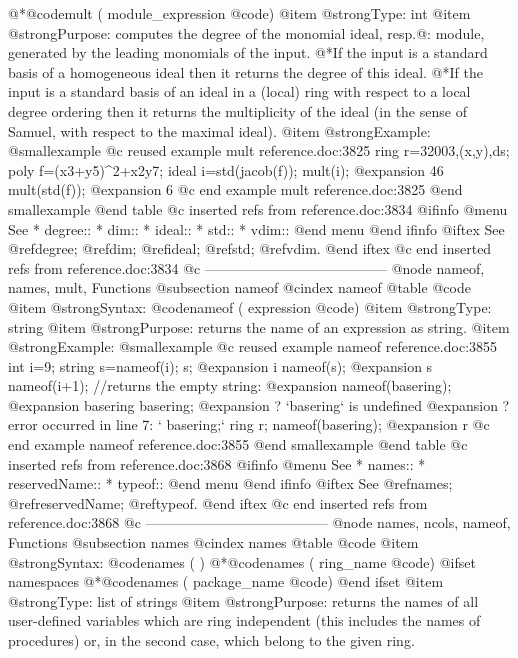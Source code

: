 {@*@code{mult (} module_expression @code{)}
@item @strong{Type:}
int
@item @strong{Purpose:}
computes the degree of the monomial ideal, resp.@: module, generated by
the leading monomials of the input.
@*If the input is a standard basis of a homogeneous ideal
then it returns the degree of this ideal.
@*If the input is a standard basis of an ideal in a (local)
ring with respect to a local degree ordering
then it returns the multiplicity of the ideal (in the sense of Samuel,
with respect to the maximal ideal).
@item @strong{Example:}
@smallexample
@c reused example mult reference.doc:3825 
  ring r=32003,(x,y),ds;
  poly f=(x3+y5)^2+x2y7;
  ideal i=std(jacob(f));
  mult(i);
@expansion{} 46
  mult(std(f));
@expansion{} 6
@c end example mult reference.doc:3825
@end smallexample
@end table
@c inserted refs from reference.doc:3834
@ifinfo
@menu
See
* degree::
* dim::
* ideal::
* std::
* vdim::
@end menu
@end ifinfo
@iftex
See
@ref{degree};
@ref{dim};
@ref{ideal};
@ref{std};
@ref{vdim}.
@end iftex
@c end inserted refs from reference.doc:3834
@c ---------------------------------------
@node nameof, names, mult, Functions
@subsection nameof
@cindex nameof
@table @code
@item @strong{Syntax:}
@code{nameof (} expression @code{)}
@item @strong{Type:}
string
@item @strong{Purpose:}
returns the name of an expression as string.
@item @strong{Example:}
@smallexample
@c reused example nameof reference.doc:3855 
  int i=9;
  string s=nameof(i);
  s;
@expansion{} i
  nameof(s);
@expansion{} s
  nameof(i+1); //returns the empty string:
@expansion{} 
  nameof(basering);
@expansion{} basering
  basering;
@expansion{}    ? `basering` is undefined
@expansion{}    ? error occurred in line 7: `  basering;`
  ring r;
  nameof(basering);
@expansion{} r
@c end example nameof reference.doc:3855
@end smallexample
@end table
@c inserted refs from reference.doc:3868
@ifinfo
@menu
See
* names::
* reservedName::
* typeof::
@end menu
@end ifinfo
@iftex
See
@ref{names};
@ref{reservedName};
@ref{typeof}.
@end iftex
@c end inserted refs from reference.doc:3868
@c ---------------------------------------
@node names, ncols, nameof, Functions
@subsection names
@cindex names
@table @code
@item @strong{Syntax:}
@code{names ( )}
@*@code{names (} ring_name @code{)}
@ifset namespaces
@*@code{names (} package_name @code{)}
@end ifset
@item @strong{Type:}
list of strings
@item @strong{Purpose:}
returns the names of all user-defined variables which are ring independent
(this includes the names of  procedures) or, in the second case, which
belong to the given ring.

}
